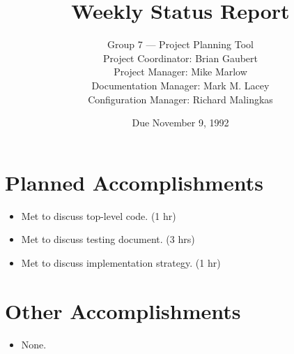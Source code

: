


\title{Weekly Status Report}

\author{Group 7 --- Project Planning Tool\\
Project Coordinator: Brian Gaubert\\
Project Manager: Mike Marlow\\
Documentation Manager: Mark M. Lacey\\
Configuration Manager: Richard Malingkas}

\date{Due November 9, 1992}

\maketitle

%
%
%
\section{Planned Accomplishments}
\begin{itemize}
	\item Met to discuss top-level code. (1 hr)
	\item Met to discuss testing document. (3 hrs)
	\item Met to discuss implementation strategy. (1 hr)
\end{itemize}

%
%
%
\section{Other Accomplishments}
\begin{itemize}
	\item None.
\end{itemize}

%
%
%
